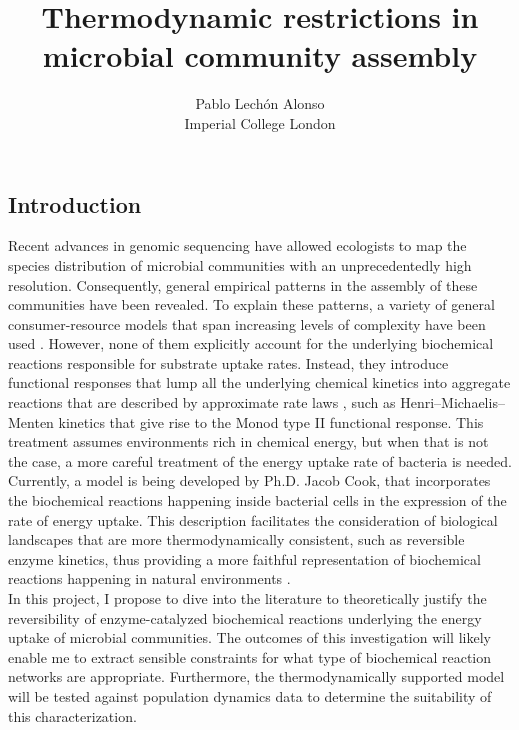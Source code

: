 \documentclass[titlepage,11pt]{article}
\begin{document}
	
	\title{\textbf{ Thermodynamic restrictions in microbial community assembly}}
	\author{Pablo Lechón Alonso \\ [30pt]
		Imperial College London}
	
	\maketitle
	\begin{linenumbers}
		\section{Introduction}
		Recent advances in genomic sequencing have allowed ecologists to map the species distribution of microbial communities with an unprecedentedly high resolution. Consequently, general empirical patterns in the assembly of these communities have been revealed. To explain these patterns, a variety of general consumer-resource models that span increasing levels of complexity have been used \citep{MacArthur1970, Goldford2018, Marsland2019a}.  However, none of them explicitly account for the underlying biochemical reactions responsible for substrate uptake rates. Instead, they introduce functional responses that lump all the underlying chemical kinetics into aggregate reactions that are described by approximate rate laws \citep{DeJong2017}, such as Henri–Michaelis–Menten kinetics that give rise to the Monod type II functional response. This treatment assumes environments rich in chemical energy, but when that is not the case, a more careful treatment of the energy uptake rate of bacteria is needed. \\
		Currently, a model is being developed by Ph.D. Jacob Cook, that incorporates the biochemical reactions happening inside bacterial cells in the expression of the rate of energy uptake. This description facilitates the consideration of biological landscapes that are more thermodynamically consistent, such as reversible enzyme kinetics, thus providing a more faithful representation of biochemical reactions happening in natural environments \citep{Jin2007}.\\
		In this project, I propose to dive into the literature to theoretically justify the reversibility of enzyme-catalyzed biochemical reactions underlying the energy uptake of microbial communities. The outcomes of this investigation will likely enable me to extract sensible constraints for what type of biochemical reaction networks are appropriate. Furthermore, the thermodynamically supported model will be tested against population dynamics data to determine the suitability of this characterization. 
		

\end{linenumbers}
\end{document}
